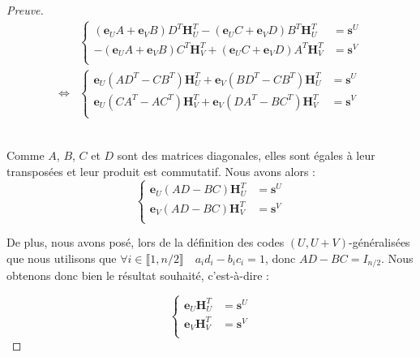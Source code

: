 \documentclass[12pt]{article}
\theoremstyle{plain}
\theoremstyle{definition}
\newcommand{\e}{\mathbf{e}}
\newcommand{\s}{\mathbf{s}}
\begin{document}
\begin{proof}[Preuve]
\begin{equation*}
\begin{aligned}
&\left\{
\begin{split}
(\e_UA+\e_VB)D^T\mathbf{H}_U^T - (\e_UC+\e_VD)B^T\mathbf{H}_U^T &= \s^U \\ 
-(\e_UA+\e_VB)C^T\mathbf{H}_V^T + (\e_UC+\e_VD)A^T\mathbf{H}_V^T &= \s^V \\
\end{split}
\right.\\
\iff
&\left\{
\begin{split}
\e_U(AD^T - CB^T)\mathbf{H}_U^T + \e_V(BD^T-CB^T)\mathbf{H}_U^T &= \s^U \\ 
\e_U(CA^T - AC^T)\mathbf{H}_V^T + \e_V(DA^T-BC^T)\mathbf{H}_V^T &= \s^V \\ 
\end{split}
\right.
\end{aligned}
\end{equation*}\

\noindent Comme $A$, $B$, $C$ et $D$ sont des matrices diagonales, elles sont égales à leur transposées et leur produit est commutatif. Nous avons alors :
\begin{equation*}
\left\{
\begin{split}
\e_U(AD - BC)\mathbf{H}_U^T &= \s^U\\
\e_V(AD - BC)\mathbf{H}_V^T &= \s^V\\
\end{split}
\right.
\end{equation*}

\noindent De plus, nous avons posé, lors de la définition des codes $(U,U+V)$-généralisées que nous utilisons que $\forall i \in \llbracket 1,n/2\rrbracket \quad a_id_i - b_ic_i = 1$, donc $AD-BC = I_{n/2}$. Nous obtenons donc bien le résultat souhaité, c'est-à-dire :

\begin{equation*}
\left\{
\begin{split}
\e_U\mathbf{H}_U^T &= \s^U\\
\e_V\mathbf{H}_V^T &= \s^V\\
\end{split}
\right.
\end{equation*}

\end{proof}
\end{document}
